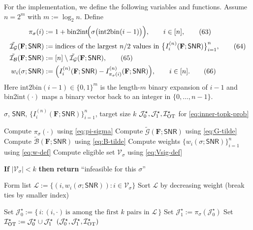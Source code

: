 \documentclass[onecolumn]{IEEEtran} %
\let\Input\Require
\let\Solve\Ensure
\newcommand{\Input}{\Require}
\newcommand{\Solve}{\Ensure}
\newcommand{\bF}{\mathbf F}
\newcommand{\1}{\mathbbm{1}}
\theoremstyle{boldremark}
\begin{document}
For the implementation, we define the following variables and functions.
Assume $n=2^m$ with $m:=\log_2 n$.
Define
\begin{align}
\pi_\sigma(i)
&:= 1+\mathrm{bin2int}\!\Bigl(\sigma\bigl(\mathrm{int2bin}(i-1)\bigr)\Bigr),
\qquad i\in[n],
\tag{63}\label{eq:pi-sigma}
\\
\tilde{\mathcal{I}_{\mathcal G}}(\mathbf F;\textsf{SNR})
&:= \text{indices of the largest $n/2$ values in }
\bigl\{I_i^{(n)}(\mathbf F;\textsf{SNR})\bigr\}_{i=1}^n,
\tag{64}\label{eq:G-tilde}
\\
\tilde{\mathcal{I}_{\mathcal B}}(\mathbf F;\textsf{SNR})
&:= [n]\setminus \tilde{\mathcal{I}_{\mathcal G}}(\mathbf F;\textsf{SNR}),
\tag{65}\label{eq:B-tilde}
\\
w_i(\sigma;\textsf{SNR})
&:= \Bigl(
I_i^{(n)}(\mathbf F;\textsf{SNR})
- I_{\pi_\sigma(i)}^{(n)}(\mathbf F;\textsf{SNR})
\Bigr),
\qquad i\in[n].
\tag{66}\label{eq:w-def}
\end{align}
Here $\mathrm{int2bin}(i-1)\in\{0,1\}^m$ is the length-$m$ binary expansion of $i-1$
and $\mathrm{bin2int}(\cdot)$ maps a binary vector back to an integer in
$\{0,\dots,n-1\}$.


\begin{algorithm}[t]
\caption{Inner solver for fixed $\sigma$}
\label{alg:inner-topk}
\begin{algorithmic}[1]
\Input $\sigma$, $\textsf{SNR}$, $\{I_i^{(n)}(\bF;\textsf{SNR})\}_{i=1}^n$, target size $k$
\Solve $\mathcal{J}_0^\star,\mathcal{J}_1^\star,\mathcal{I}_{\rm OT}^\star$ for \eqref{eq:inner-topk-prob}

\State Compute $\pi_\sigma(\cdot)$ using \eqref{eq:pi-sigma}
\State Compute $\tilde{\mathcal{G}}(\bF;\textsf{SNR})$ using \eqref{eq:G-tilde}
\State Compute $\tilde{\mathcal{B}}(\bF;\textsf{SNR})$ using \eqref{eq:B-tilde}
\State Compute weights $\{w_i(\sigma;\textsf{SNR})\}_{i=1}^n$ using \eqref{eq:w-def}
\State Compute eligible set $\mathcal{V}_\sigma$ using \eqref{eq:Vsig-def}

\State \textbf{If} $|\mathcal{V}_\sigma|<k$ \textbf{then return} ``infeasible for this $\sigma$''

\State Form list $\mathcal{L} := \{(i,w_i(\sigma;\textsf{SNR})) : i\in\mathcal{V}_\sigma\}$
\State Sort $\mathcal{L}$ by decreasing weight (break ties by smaller index)

\State Set $\mathcal{J}_0^\star := \{\, i : (i,\cdot)\ \text{is among the first $k$ pairs in }\mathcal{L}\,\}$
\State Set $\mathcal{J}_1^\star := \pi_\sigma(\mathcal{J}_0^\star)$
\State Set $\mathcal{I}_{\rm OT}^\star := \mathcal{J}_0^\star \cup \mathcal{J}_1^\star$
\State \Return $(\mathcal{J}_0^\star,\mathcal{J}_1^\star,\mathcal{I}_{\rm OT}^\star)$
\end{algorithmic}
\end{algorithm}
\end{document}

